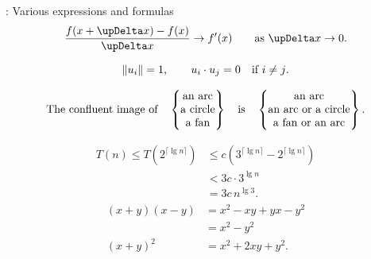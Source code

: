 \documentclass[aspectratio = 169, t, 10pt]{beamer}
\begin{document}
\begin{frame}[allowframebreaks]{\insertsection: Various expressions and formulas}
$$\frac{f(x+\upDelta x)-f(x)}{\upDelta x}\to f'(x)
\qquad \hbox{as $\upDelta x\to0$.}$$

$$\|u_i\|=1,\qquad u_i\cdot u_j=0\quad\hbox{if $i\ne j$.}$$


$$\hbox{The confluent image of}\quad
\begin{Bmatrix}
	\hfill\hbox{an arc}\hfill\\
	\hfill\hbox{a circle}\hfill\\
	\hfill\hbox{a fan}\hfill\\
\end{Bmatrix}
\quad\hbox{is}\quad
\begin{Bmatrix}
	\hfill\hbox{an arc}\hfill\\
	\hfill\hbox{an arc or a circle}\hfill\\
	\hfill\hbox{a fan or an arc}\hfill
\end{Bmatrix}.$$
\endgroup

\framebreak

\begin{align*}
T(n)\le T(2^{\lceil\lg n\rceil})
&\le c(3^{\lceil\lg n\rceil}-2^{\lceil\lg n\rceil})\\
&<3c\cdot3^{\lg n}\\
&=3c\,n^{\lg3}.
\end{align*}
\begin{align*}
\begin{aligned}
(x+y)(x-y)&=x^2-xy+yx-y^2\\
&=x^2-y^2\\
(x+y)^2&=x^2+2xy+y^2.
\end{aligned}
\end{align*}


\end{frame}
\end{document}
